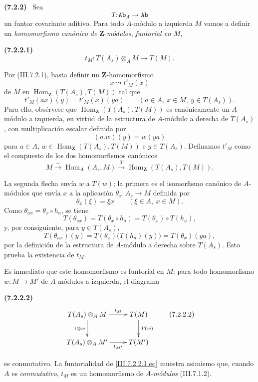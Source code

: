 \documentclass[10pt,oneside]{book}
\newcommand{\bb}[1]{\mathbf{#1}}
\newcommand{\cat}[1]{\mathtt{#1}}
\newcommand{\Hom}{\operatorname{Hom}}
\newcommand{\sref}[2][]{\textup{(#2)}}
\newenvironment{env}[1][]{\par\medskip\noindent\textbf{(#1)}\ }{\par}
\begin{document}
\begin{env}[7.2.2]
\label{III.7.2.2}
Sea
\[
  T:\cat{Ab}_A\longrightarrow\cat{Ab}
\]
un funtor covariante aditivo. Para todo $A$-módulo a izquierda
$M$ vamos a definir un \emph{homomorfismo canónico de} $\bb Z$-\emph{módulos},
\emph{funtorial en} $M$,
\begin{env}[7.2.2.1]
\label{III.7.2.2.1}
\[
  t_M:T(A_s)\otimes_A M\longrightarrow T(M).
  \tag{7.2.2.1}\label{III.7.2.2.1.eq}
\]
\end{env}
Por \sref{III.7.2.1}, basta definir un $\bb Z$-homomorfismo
\[
  x\leadsto t'_M(x)
\]
de $M$ en $\Hom_{\bb Z}(T(A_s),T(M))$ tal que
\[
  t'_M(ax)(y)=t'_M(x)(ya)
  \qquad(a\in A,\ x\in M,\ y\in T(A_s)).
\]
Para ello, obsérvese que $\Hom_{\bb Z}(T(A_s),T(M))$ es
canónicamente un $A$-módulo a izquierda, en virtud de la
estructura de $A$-módulo a derecha de $T(A_s)$, con
multiplicación escalar definida por
\[
  (a.w)(y)=w(ya)
\]
para $a\in A$, $w\in\Hom_{\bb Z}(T(A_s),T(M))$ e
$y\in T(A_s)$. Definamos $t'_M$ como el compuesto de los dos
homomorfismos canónicos
\[
  M
  \xrightarrow{\sim}
  \Hom_A(A_s,M)
  \xrightarrow{T}
  \Hom_{\bb Z}(T(A_s),T(M)).
\]

La segunda flecha envía $w$ a $T(w)$; la primera es el
isomorfismo canónico de $A$-módulos que envía $x$ a la aplicación
$\theta_x:A_s\to M$ definida por
\[
  \theta_x(\xi)=\xi x
  \qquad(\xi\in A,\ x\in M).
\]
Como $\theta_{ax}=\theta_x\circ h_a$, se tiene
\[
  T(\theta_{ax})
  =
  T(\theta_x\circ h_a)
  =
  T(\theta_x)\circ T(h_a),
\]
y, por consiguiente, para $y\in T(A_s)$,
\[
  T(\theta_{ax})(y)
  =
  T(\theta_x)\bigl(T(h_a)(y)\bigr)
  =
  T(\theta_x)(ya),
\]
por la definición de la estructura de $A$-módulo a derecha sobre
$T(A_s)$. Esto prueba la existencia de $t_M$.

Es inmediato que este homomorfismo es funtorial en $M$: para todo
homomorfismo $w:M\to M'$ de $A$-módulos a izquierda, el diagrama
\begin{env}[7.2.2.2]
\label{III.7.2.2.2}
\[
\xymatrix{
  T(A_s)\otimes_A M
    \ar[r]^-{t_M}\ar[d]_{1\otimes w}
  & T(M)\ar[d]^{T(w)}
  \\
  T(A_s)\otimes_A M'
    \ar[r]_-{t_{M'}}
  & T(M')
}
\tag{7.2.2.2}\label{III.7.2.2.2.eq}
\]
\end{env}
es conmutativo. La funtorialidad de
\eqref{III.7.2.2.1.eq} muestra asimismo que, cuando $A$ es
\emph{conmutativo}, $t_M$ es un homomorfismo de $A$-\emph{módulos}
\sref{III.7.1.2}.
\end{env}
\end{document}
